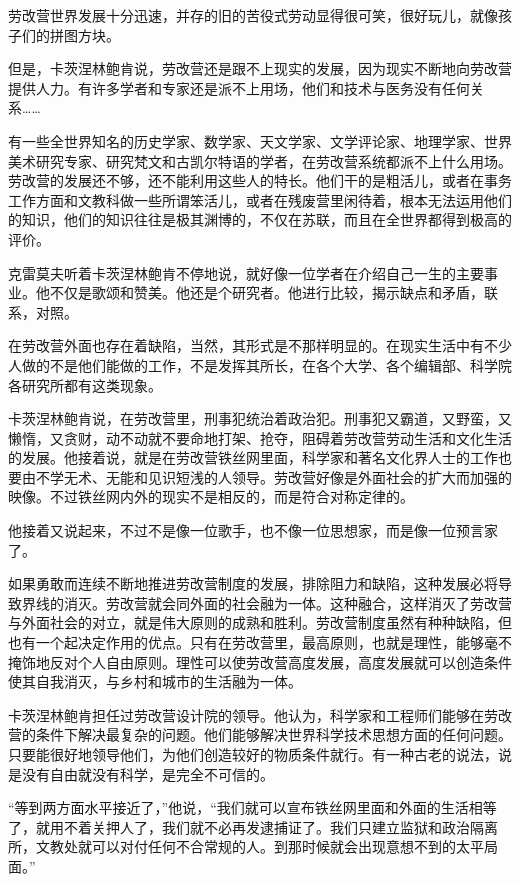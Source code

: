 劳改营世界发展十分迅速，并存的旧的苦役式劳动显得很可笑，很好玩儿，就像孩子们的拼图方块。

但是，卡茨涅林鲍肯说，劳改营还是跟不上现实的发展，因为现实不断地向劳改营提供人力。有许多学者和专家还是派不上用场，他们和技术与医务没有任何关系……

有一些全世界知名的历史学家、数学家、天文学家、文学评论家、地理学家、世界美术研究专家、研究梵文和古凯尔特语的学者，在劳改营系统都派不上什么用场。劳改营的发展还不够，还不能利用这些人的特长。他们干的是粗活儿，或者在事务工作方面和文教科做一些所谓笨活儿，或者在残废营里闲待着，根本无法运用他们的知识，他们的知识往往是极其渊博的，不仅在苏联，而且在全世界都得到极高的评价。

克雷莫夫听着卡茨涅林鲍肯不停地说，就好像一位学者在介绍自己一生的主要事业。他不仅是歌颂和赞美。他还是个研究者。他进行比较，揭示缺点和矛盾，联系，对照。

在劳改营外面也存在着缺陷，当然，其形式是不那样明显的。在现实生活中有不少人做的不是他们能做的工作，不是发挥其所长，在各个大学、各个编辑部、科学院各研究所都有这类现象。

卡茨涅林鲍肯说，在劳改营里，刑事犯统治着政治犯。刑事犯又霸道，又野蛮，又懒惰，又贪财，动不动就不要命地打架、抢夺，阻碍着劳改营劳动生活和文化生活的发展。他接着说，就是在劳改营铁丝网里面，科学家和著名文化界人士的工作也要由不学无术、无能和见识短浅的人领导。劳改营好像是外面社会的扩大而加强的映像。不过铁丝网内外的现实不是相反的，而是符合对称定律的。

他接着又说起来，不过不是像一位歌手，也不像一位思想家，而是像一位预言家了。

如果勇敢而连续不断地推进劳改营制度的发展，排除阻力和缺陷，这种发展必将导致界线的消灭。劳改营就会同外面的社会融为一体。这种融合，这样消灭了劳改营与外面社会的对立，就是伟大原则的成熟和胜利。劳改营制度虽然有种种缺陷，但也有一个起决定作用的优点。只有在劳改营里，最高原则，也就是理性，能够毫不掩饰地反对个人自由原则。理性可以使劳改营高度发展，高度发展就可以创造条件使其自我消灭，与乡村和城市的生活融为一体。

卡茨涅林鲍肯担任过劳改营设计院的领导。他认为，科学家和工程师们能够在劳改营的条件下解决最复杂的问题。他们能够解决世界科学技术思想方面的任何问题。只要能很好地领导他们，为他们创造较好的物质条件就行。有一种古老的说法，说是没有自由就没有科学，是完全不可信的。

“等到两方面水平接近了，”他说，“我们就可以宣布铁丝网里面和外面的生活相等了，就用不着关押人了，我们就不必再发逮捕证了。我们只建立监狱和政治隔离所，文教处就可以对付任何不合常规的人。到那时候就会出现意想不到的太平局面。”

